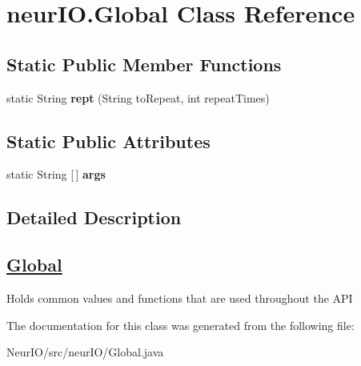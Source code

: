 \hypertarget{classneur_i_o_1_1_global}{}\section{neur\+I\+O.\+Global Class Reference}
\label{classneur_i_o_1_1_global}
\subsection*{Static Public Member Functions}
\begin{DoxyCompactItemize}
\item 
\mbox{\label{classneur_i_o_1_1_global_a37771c58148bb2d133618814f8267e6c}} 
static String {\bfseries rept} (String to\+Repeat, int repeat\+Times)
\end{DoxyCompactItemize}
\subsection*{Static Public Attributes}
\begin{DoxyCompactItemize}
\item 
\mbox{\label{classneur_i_o_1_1_global_a3c6209cd45e77078a54b91b9a4f4f677}} 
static String \mbox{[}$\,$\mbox{]} {\bfseries args}
\end{DoxyCompactItemize}


\subsection{Detailed Description}
\subsection*{\hyperlink{classneur_i_o_1_1_global}{Global} }

Holds common values and functions that are used throughout the A\+PI 

The documentation for this class was generated from the following file\+:\begin{DoxyCompactItemize}
\item 
Neur\+I\+O/src/neur\+I\+O/Global.\+java\end{DoxyCompactItemize}
